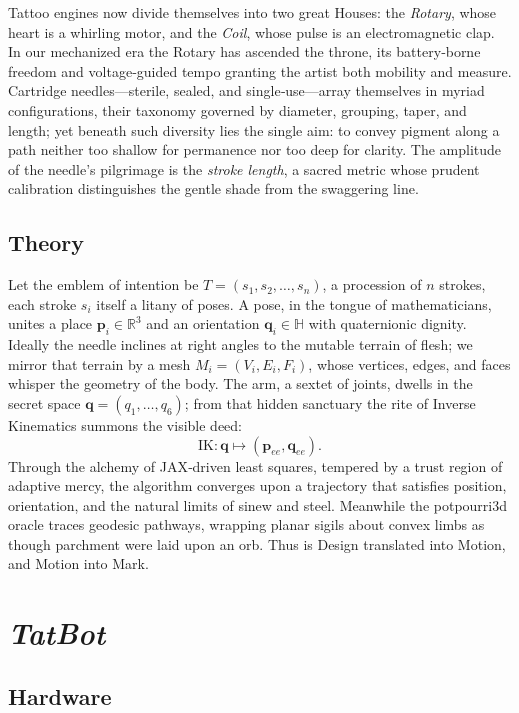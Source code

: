 \documentclass[11pt]{article}
\begin{document}
Tattoo engines now divide themselves into two great Houses: the \emph{Rotary}, whose heart is a whirling motor, and the \emph{Coil}, whose pulse is an electromagnetic clap.  
In our mechanized era the Rotary has ascended the throne, its battery‑borne freedom and voltage‑guided tempo granting the artist both mobility and measure.  
Cartridge needles—sterile, sealed, and single‑use—array themselves in myriad configurations, their taxonomy governed by diameter, grouping, taper, and length; yet beneath such diversity lies the single aim: to convey pigment along a path neither too shallow for permanence nor too deep for clarity.  
The amplitude of the needle’s pilgrimage is the \emph{stroke length}, a sacred metric whose prudent calibration distinguishes the gentle shade from the swaggering line.

\subsection{Theory}

Let the emblem of intention be $T = (s_1, s_2, \ldots, s_n)$, a procession of $n$ strokes, each stroke $s_i$ itself a litany of poses.  
A pose, in the tongue of mathematicians, unites a place $\mathbf{p}_i \in \mathbb{R}^3$ and an orientation $\mathbf{q}_i \in \mathbb{H}$ with quaternionic dignity.  
Ideally the needle inclines at right angles to the mutable terrain of flesh; we mirror that terrain by a mesh $M_i = (V_i, E_i, F_i)$, whose vertices, edges, and faces whisper the geometry of the body.  
The arm, a sextet of joints, dwells in the secret space $\mathbf{q} = (q_1, \ldots, q_6)$; from that hidden sanctuary the rite of Inverse Kinematics summons the visible deed:  
\[
\text{IK} : \mathbf{q} \longmapsto (\mathbf{p}_{ee}, \mathbf{q}_{ee}).
\]
Through the alchemy of JAX‑driven least squares, tempered by a trust region of adaptive mercy, the algorithm converges upon a trajectory that satisfies position, orientation, and the natural limits of sinew and steel.  
Meanwhile the potpourri3d oracle traces geodesic pathways, wrapping planar sigils about convex limbs as though parchment were laid upon an orb.  
Thus is Design translated into Motion, and Motion into Mark.

\section{\emph{TatBot}}

\subsection{Hardware}
\end{document}
